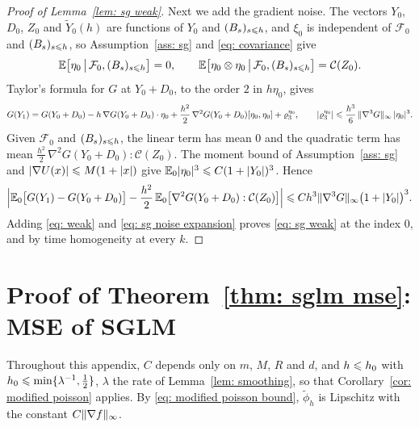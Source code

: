 \begin{proof}[Proof of Lemma~\ref{lem: sg weak}]
    Next we add the gradient noise. The vectors $Y_0$, $D_0$, $Z_0$ and $\tilde Y_0(h)$ are functions of $Y_0$ and $(B_s)_{s \leqslant h}$, and $\xi_0$ is independent of $\mathcal F_0$ and $(B_s)_{s \leqslant h}$, so Assumption~\ref{ass: sg} and \eqref{eq: covariance} give
    \begin{equation*}
        \mathbb E\bigl[ \eta_0 \,\big|\, \mathcal F_0, (B_s)_{s \leqslant h} \bigr] = 0 , \qquad \mathbb E\bigl[ \eta_0 \otimes \eta_0 \,\big|\, \mathcal F_0, (B_s)_{s \leqslant h} \bigr] = \mathcal C(Z_0) .
    \end{equation*}
    Taylor's formula for $G$ at $Y_0 + D_0$, to the order $2$ in $h\eta_0$, gives
    \begin{equation*}
        G(Y_1) = G(Y_0 + D_0) - h\, \nabla G(Y_0+D_0) \cdot \eta_0 + \frac{h^2}{2}\, \nabla^2 G(Y_0+D_0)[\eta_0, \eta_0] + \varrho_3^{\eta_0} , \qquad |\varrho_3^{\eta_0}| \leqslant \frac{h^3}{6}\, \lVert \nabla^3 G \rVert_\infty\, |\eta_0|^3 .
    \end{equation*}
    Given $\mathcal F_0$ and $(B_s)_{s \leqslant h}$, the linear term has mean $0$ and the quadratic term has mean $\frac{h^2}{2}\, \nabla^2 G(Y_0+D_0) : \mathcal C(Z_0)$. The moment bound of Assumption~\ref{ass: sg} and $|\nabla U(x)| \leqslant M(1+|x|)$ give $\mathbb E_0 |\eta_0|^3 \leqslant C ( 1 + |Y_0| )^3$. Hence
    \begin{equation}
        \Bigl| \mathbb E_0\bigl[ G(Y_1) - G(Y_0 + D_0) \bigr] - \frac{h^2}{2}\, \mathbb E_0\bigl[ \nabla^2 G(Y_0 + D_0) : \mathcal C(Z_0) \bigr] \Bigr| \leqslant C h^3 \lVert \nabla^3 G \rVert_\infty \bigl( 1+|Y_0| \bigr)^3 .
        \label{eq: sg noise expansion}
    \end{equation}
    Adding \eqref{eq: weak} and \eqref{eq: sg noise expansion} proves \eqref{eq: sg weak} at the index $0$, and by time homogeneity at every $k$.
\end{proof}

\section{Proof of Theorem~\ref{thm: sglm mse}: MSE of SGLM}
\label{app: mse}

Throughout this appendix, $C$ depends only on $m$, $M$, $R$ and $d$, and $h \leqslant h_0$ with $h_0 \leqslant \min\{\lambda^{-1}, \frac12\}$, $\lambda$ the rate of Lemma~\ref{lem: smoothing}, so that Corollary~\ref{cor: modified poisson} applies. By \eqref{eq: modified poisson bound}, $\tilde\phi_h$ is Lipschitz with the constant $C \lVert \nabla f \rVert_\infty$.

